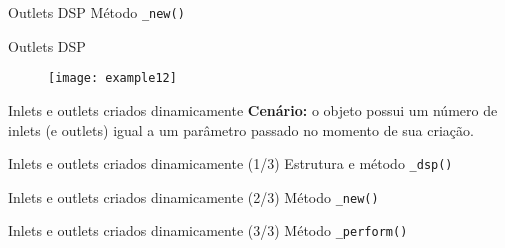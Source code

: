 \begin{frame}{Outlets DSP}
{Método \texttt{\_new()}}

\end{frame}


\begin{frame}{Outlets DSP}
\begin{figure}[h!]
\centering
\texttt{[image: example12]}
\end{figure}
\end{frame}


\begin{frame}{Inlets e outlets criados dinamicamente}
\textbf{Cenário:} o objeto possui um número de inlets (e outlets) igual a um parâmetro
passado no momento de sua criação. 
\end{frame}


\begin{frame}{Inlets e outlets criados dinamicamente (1/3)}
{Estrutura e método \texttt{\_dsp()}}

\end{frame}


\begin{frame}{Inlets e outlets criados dinamicamente (2/3)}
{Método \texttt{\_new()}}

\end{frame}


\begin{frame}{Inlets e outlets criados dinamicamente (3/3)}
{Método \texttt{\_perform()}}

\end{frame}
